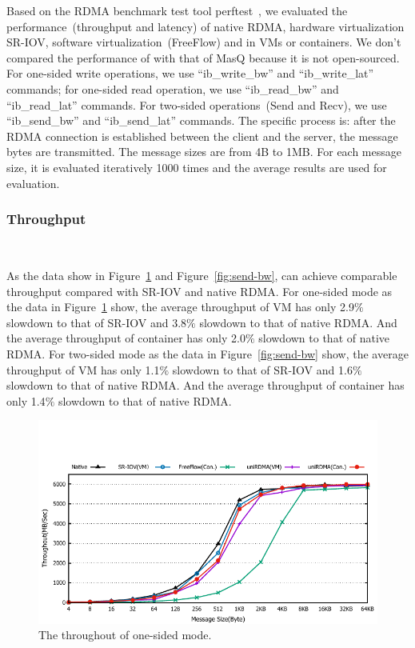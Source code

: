 Based on the RDMA benchmark test tool perftest~\cite{perftest}, we evaluated the performance~(throughput and latency) of native RDMA, hardware virtualization SR-IOV,  software virtualization~(FreeFlow) and \sys in VMs or containers. We don't compared the performance of \sys with that of MasQ because it is not open-sourced. For one-sided write operations, we use ``ib\_write\_bw'' and ``ib\_write\_lat'' commands; for one-sided read operation, we use ``ib\_read\_bw'' and ``ib\_read\_lat'' commands. For two-sided operations~(Send and Recv), we use ``ib\_send\_bw'' and ``ib\_send\_lat'' commands. The specific process is: after the RDMA connection is established between the client and the server, the message bytes are transmitted. The message sizes are from 4B to 1MB. For each message size,  it is evaluated iteratively 1000 times and the average results are used for evaluation.  

\subsubsection{\textbf{Throughput}}
\
\noindent

As the data show in Figure~\ref{fig:write-bw} and Figure~\ref{fig:send-bw}, \sys can achieve comparable throughput compared with SR-IOV and native RDMA. For one-sided mode as the data in Figure~\ref{fig:write-bw} show, the average throughput of \sys VM has only 2.9$\%$ slowdown to that of SR-IOV and 3.8$\%$ slowdown to that of native RDMA. And the average throughput of \sys container has only 2.0$\%$ slowdown to that of native RDMA. For two-sided mode as the data in Figure~\ref{fig:send-bw} show, the average throughput of \sys VM has only 1.1$\%$ slowdown to that of SR-IOV and 1.6$\%$ slowdown to that of native RDMA. And the average throughput of \sys container has only 1.4$\%$ slowdown to that of native RDMA.



\begin{figure}[!ht]
	\centering
	\includegraphics[width=1.0\linewidth]{images/write-bw.pdf}
	\caption{The throughout of one-sided mode.}
	\label{fig:write-bw}
\end{figure}


